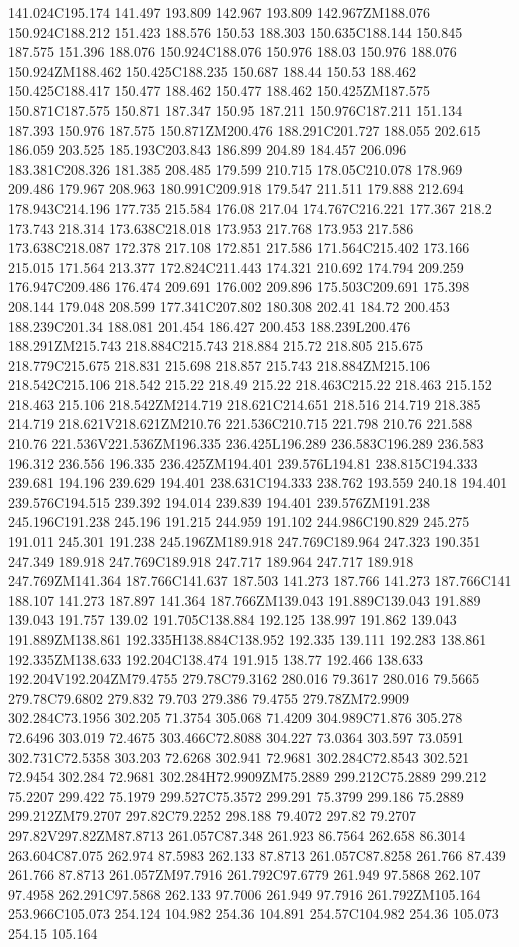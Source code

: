 141.024C195.174 141.497 193.809 142.967 193.809 142.967ZM188.076 150.924C188.212 151.423 188.576 150.53 188.303 150.635C188.144 150.845 187.575 151.396 188.076 150.924C188.076 150.976 188.03 150.976 188.076 150.924ZM188.462 150.425C188.235 150.687 188.44 150.53 188.462 150.425C188.417 150.477 188.462 150.477 188.462 150.425ZM187.575 150.871C187.575 150.871 187.347 150.95 187.211 150.976C187.211 151.134 187.393 150.976 187.575 150.871ZM200.476 188.291C201.727 188.055 202.615 186.059 203.525 185.193C203.843 186.899 204.89 184.457 206.096 183.381C208.326 181.385 208.485 179.599 210.715 178.05C210.078 178.969 209.486 179.967 208.963 180.991C209.918 179.547 211.511 179.888 212.694 178.943C214.196 177.735 215.584 176.08 217.04 174.767C216.221 177.367 218.2 173.743 218.314 173.638C218.018 173.953 217.768 173.953 217.586 173.638C218.087 172.378 217.108 172.851 217.586 171.564C215.402 173.166 215.015 171.564 213.377 172.824C211.443 174.321 210.692 174.794 209.259 176.947C209.486 176.474 209.691 176.002 209.896 175.503C209.691 175.398 208.144 179.048 208.599 177.341C207.802 180.308 202.41 184.72 200.453 188.239C201.34 188.081 201.454 186.427 200.453 188.239L200.476 188.291ZM215.743 218.884C215.743 218.884 215.72 218.805 215.675 218.779C215.675 218.831 215.698 218.857 215.743 218.884ZM215.106 218.542C215.106 218.542 215.22 218.49 215.22 218.463C215.22 218.463 215.152 218.463 215.106 218.542ZM214.719 218.621C214.651 218.516 214.719 218.385 214.719 218.621V218.621ZM210.76 221.536C210.715 221.798 210.76 221.588 210.76 221.536V221.536ZM196.335 236.425L196.289 236.583C196.289 236.583 196.312 236.556 196.335 236.425ZM194.401 239.576L194.81 238.815C194.333 239.681 194.196 239.629 194.401 238.631C194.333 238.762 193.559 240.18 194.401 239.576C194.515 239.392 194.014 239.839 194.401 239.576ZM191.238 245.196C191.238 245.196 191.215 244.959 191.102 244.986C190.829 245.275 191.011 245.301 191.238 245.196ZM189.918 247.769C189.964 247.323 190.351 247.349 189.918 247.769C189.918 247.717 189.964 247.717 189.918 247.769ZM141.364 187.766C141.637 187.503 141.273 187.766 141.273 187.766C141 188.107 141.273 187.897 141.364 187.766ZM139.043 191.889C139.043 191.889 139.043 191.757 139.02 191.705C138.884 192.125 138.997 191.862 139.043 191.889ZM138.861 192.335H138.884C138.952 192.335 139.111 192.283 138.861 192.335ZM138.633 192.204C138.474 191.915 138.77 192.466 138.633 192.204V192.204ZM79.4755 279.78C79.3162 280.016 79.3617 280.016 79.5665 279.78C79.6802 279.832 79.703 279.386 79.4755 279.78ZM72.9909 302.284C73.1956 302.205 71.3754 305.068 71.4209 304.989C71.876 305.278 72.6496 303.019 72.4675 303.466C72.8088 304.227 73.0364 303.597 73.0591 302.731C72.5358 303.203 72.6268 302.941 72.9681 302.284C72.8543 302.521 72.9454 302.284 72.9681 302.284H72.9909ZM75.2889 299.212C75.2889 299.212 75.2207 299.422 75.1979 299.527C75.3572 299.291 75.3799 299.186 75.2889 299.212ZM79.2707 297.82C79.2252 298.188 79.4072 297.82 79.2707 297.82V297.82ZM87.8713 261.057C87.348 261.923 86.7564 262.658 86.3014 263.604C87.075 262.974 87.5983 262.133 87.8713 261.057C87.8258 261.766 87.439 261.766 87.8713 261.057ZM97.7916 261.792C97.6779 261.949 97.5868 262.107 97.4958 262.291C97.5868 262.133 97.7006 261.949 97.7916 261.792ZM105.164 253.966C105.073 254.124 104.982 254.36 104.891 254.57C104.982 254.36 105.073 254.15 105.164 